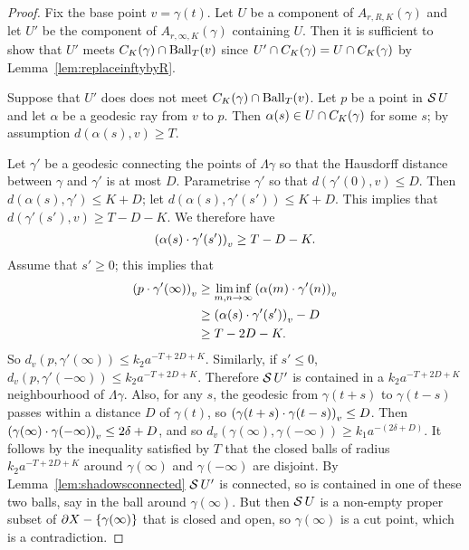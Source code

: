 \begin{proof} Fix the base point $v = \gamma(t)$.
Let $U$ be a component of $A_{r, R, K}(\gamma)$ and let $U'$ be the component
of $A_{r, \infty, K}(\gamma)$ containing $U$.
Then it is sufficient to show that $U'$ meets $C_K(\gamma) \intersection
\Ball_T(v)$ since $U' \intersection C_K(\gamma) = U \intersection C_K(\gamma)$
by Lemma~\ref{lem:replaceinftybyR}. 

Suppose that $U'$ does does not meet $C_K(\gamma) \intersection \Ball_T(v)$.
Let $p$ be a point in $\shadow U$ and let $\alpha$ be a geodesic ray from $v$
to $p$.
Then $\alpha(s) \in U \intersection C_K(\gamma)$ for some $s$; by assumption
$d(\alpha(s), v) \geq T$.

Let $\gamma'$ be a geodesic connecting the points of $\Lambda\gamma$ so that
the Hausdorff distance between $\gamma$ and $\gamma'$ is at most $D$.
Parametrise $\gamma'$ so that $d(\gamma'(0), v) \leq D$.
Then $d(\alpha(s), \gamma') \leq K + D$; let $d(\alpha(s), \gamma'(s')) \leq K
+ D$.
This implies that $d(\gamma'(s'), v)\geq T - D - K$.
We therefore have
\begin{align*}
  \gromprod[v]{\alpha(s)}{\gamma'(s')} \geq T - D - K.
\end{align*}
Assume that $s'\geq0$; this implies that
\begin{align*}
  \gromprod[v]{p}{\gamma'(\infty)} & \geq \liminf_{m, n \to \infty}\gromprod[v]{\alpha(m)}{\gamma'(n)} \\
                                   & \geq \gromprod[v]{\alpha(s)}{\gamma'(s')} - D \\
                                   & \geq T - 2D - K.
\end{align*}
So $d_v(p, \gamma'(\infty)) \leq k_2a^{-T + 2D + K}$. Similarly, if $s' \leq 0$, $d_v(p,
\gamma'(-\infty)) \leq k_2a^{-T + 2D + K}$. Therefore $\shadow U'$
is contained in a $k_2a^{-T + 2D + K}$ neighbourhood of $\Lambda\gamma$.  Also,
for any $s$, the geodesic from $\gamma(t+s)$ to $\gamma(t-s)$ passes within a
distance $D$ of $\gamma(t)$, so $\gromprod[v]{\gamma(t+s)}{\gamma(t-s)} \leq
D$. Then $\gromprod[v]{\gamma(\infty)}{\gamma(-\infty)} \leq 2\delta + D$, and
so $d_v(\gamma(\infty), \gamma(-\infty)) \geq k_1a^{-(2\delta + D)}$. It follows by
the inequality satisfied by $T$ that the closed balls of radius $k_2a^{-T + 2D
+ K}$ around $\gamma(\infty)$ and $\gamma(-\infty)$ are disjoint. By
Lemma~\ref{lem:shadowsconnected} $\shadow U'$ is connected, so is 
contained in one of these two balls, say in the ball around $\gamma(\infty)$.
But then $\shadow U$ is a non-empty proper subset of $\boundary X -
\{\gamma(\infty)\}$ that is closed and open, so $\gamma(\infty)$ is a cut
point, which is a contradiction.\end{proof}

